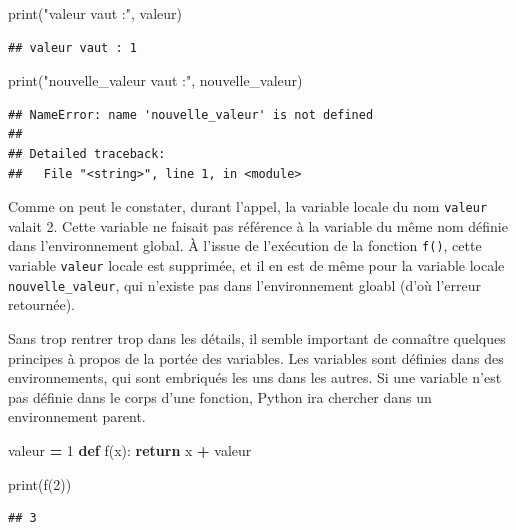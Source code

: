 \documentclass[12pt,]{book}
\newenvironment{Shaded}{\begin{snugshade}}{\end{snugshade}}
\newcommand{\KeywordTok}[1]{\textcolor[rgb]{0.13,0.29,0.53}{\textbf{#1}}}
\newcommand{\DecValTok}[1]{\textcolor[rgb]{0.00,0.00,0.81}{#1}}
\newcommand{\StringTok}[1]{\textcolor[rgb]{0.31,0.60,0.02}{#1}}
\newcommand{\ControlFlowTok}[1]{\textcolor[rgb]{0.13,0.29,0.53}{\textbf{#1}}}
\newcommand{\OperatorTok}[1]{\textcolor[rgb]{0.81,0.36,0.00}{\textbf{#1}}}
\newcommand{\BuiltInTok}[1]{#1}
\newcommand{\NormalTok}[1]{#1}
\numberwithin{equation}{section}
\numberwithin{countremarque}{section}
\begin{document}
\begin{Shaded}
\begin{Highlighting}[]
\BuiltInTok{print}\NormalTok{(}\StringTok{"valeur vaut :"}\NormalTok{, valeur)}
\end{Highlighting}
\end{Shaded}

\begin{lstlisting}
## valeur vaut : 1
\end{lstlisting}

\begin{Shaded}
\begin{Highlighting}[]
\BuiltInTok{print}\NormalTok{(}\StringTok{"nouvelle_valeur vaut :"}\NormalTok{, nouvelle_valeur)}
\end{Highlighting}
\end{Shaded}

\begin{lstlisting}
## NameError: name 'nouvelle_valeur' is not defined
## 
## Detailed traceback: 
##   File "<string>", line 1, in <module>
\end{lstlisting}

Comme on peut le constater, durant l'appel, la variable locale du nom
\texttt{valeur} valait 2. Cette variable ne faisait pas référence à la
variable du même nom définie dans l'environnement global. À l'issue de
l'exécution de la fonction \texttt{f()}, cette variable \texttt{valeur}
locale est supprimée, et il en est de même pour la variable locale
\texttt{nouvelle\_valeur}, qui n'existe pas dans l'environnement gloabl
(d'où l'erreur retournée).

Sans trop rentrer trop dans les détails, il semble important de
connaître quelques principes à propos de la portée des variables. Les
variables sont définies dans des environnements, qui sont embriqués les
uns dans les autres. Si une variable n'est pas définie dans le corps
d'une fonction, Python ira chercher dans un environnement parent.

\begin{Shaded}
\begin{Highlighting}[]
\NormalTok{valeur }\OperatorTok{=} \DecValTok{1}
\KeywordTok{def}\NormalTok{ f(x):}
  \ControlFlowTok{return}\NormalTok{ x }\OperatorTok{+}\NormalTok{ valeur}
  
\BuiltInTok{print}\NormalTok{(f(}\DecValTok{2}\NormalTok{))}
\end{Highlighting}
\end{Shaded}

\begin{lstlisting}
## 3
\end{lstlisting}
\end{document}
